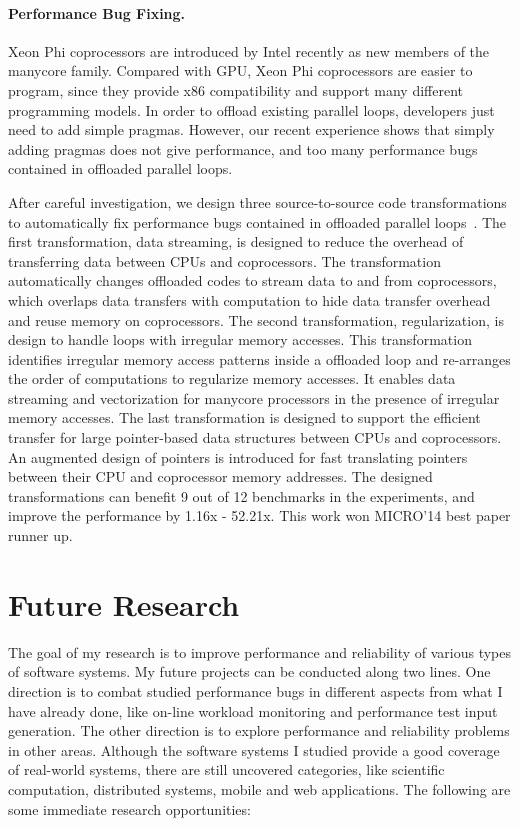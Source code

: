 \documentclass[10pt]{article}
\begin{document}
\paragraph{Performance Bug Fixing.}
Xeon Phi coprocessors are introduced by Intel recently as new members of the manycore family. 
Compared with GPU, Xeon Phi coprocessors are easier to program, 
since they provide x86 compatibility and support many different programming models. 
In order to offload existing parallel loops, developers just need to add simple pragmas. 
However, our recent experience shows that simply adding pragmas does not give performance, 
and too many performance bugs contained in offloaded parallel loops. 

After careful investigation, we design three source-to-source code transformations to 
automatically fix performance bugs contained in offloaded parallel loops~\cite{Song14MICRO}. 
The first transformation, data streaming, is designed to reduce the overhead of transferring data between CPUs and coprocessors. 
The transformation automatically changes offloaded codes to stream data to and from coprocessors, which overlaps data transfers 
with computation to hide data transfer overhead and reuse memory on coprocessors. 
The second transformation, regularization, is design to handle loops with irregular memory accesses. 
This transformation identifies irregular memory access patterns inside a offloaded loop and re-arranges the order of computations to regularize memory accesses. 
It enables data streaming and vectorization for manycore processors in the presence of irregular memory accesses. 
The last transformation is designed to support the efficient transfer for large pointer-based data structures between CPUs and coprocessors. 
An augmented design of pointers is introduced for fast translating pointers between their CPU and coprocessor memory addresses. 
The designed transformations can benefit 9 out of 12 benchmarks in the experiments, and improve the performance by 1.16x - 52.21x. 
This work won MICRO'14 best paper runner up. 



\section{Future Research}

The goal of my research is to improve performance and reliability of various types of software systems. 
My future projects can be conducted along two lines. 
One direction is to combat studied performance bugs in different aspects from what I have already done, 
like on-line workload monitoring and performance test input generation. 
The other direction is to explore performance and reliability problems in other areas. 
Although the software systems I studied provide a good coverage of real-world systems, 
there are still uncovered categories, 
like scientific computation, distributed systems, mobile and web applications. 
The following are some immediate research opportunities: 
\end{document}
